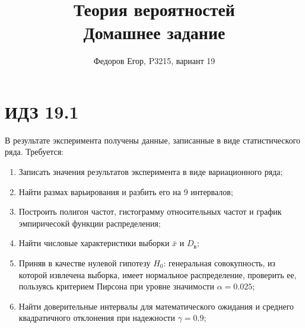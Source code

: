 \documentclass{article}
\title{\textbf{Теория вероятностей} \\ Домашнее задание \textnumero 2}
\author{Федоров Егор, P3215, вариант 19}
\date{}
\theoremstyle{problemstyle}
\begin{document}
\maketitle
\section{ИДЗ 19.1}
В результате эксперимента получены данные, записанные в виде статистического ряда.
Требуется:
\begin{enumerate}
	\item Записать значения результатов эксперимента в виде вариационного ряда;
	\item Найти размах варьирования и разбить его на 9 интервалов;
	\item Построить полигон частот, гистограмму относительных частот и график
	      эмпиричесокй функции распределения;
	\item Найти числовые характеристики выборки \(\bar x\) и \(D_\text{в}\);
	\item Приняв в качестве нулевой гипотезу \(H_0\): генеральная совокупность,
	      из которой извлечена выборка, имеет нормальное распределение, проверить ее,
	      пользуясь критерием Пирсона при уровне значимости \(\alpha = 0.025\);
	\item Найти доверительные интервалы для математического ожидания и среднего
	      квадратичного отклонения при надежности \(\gamma = 0.9\);
\end{enumerate}
\end{document}
